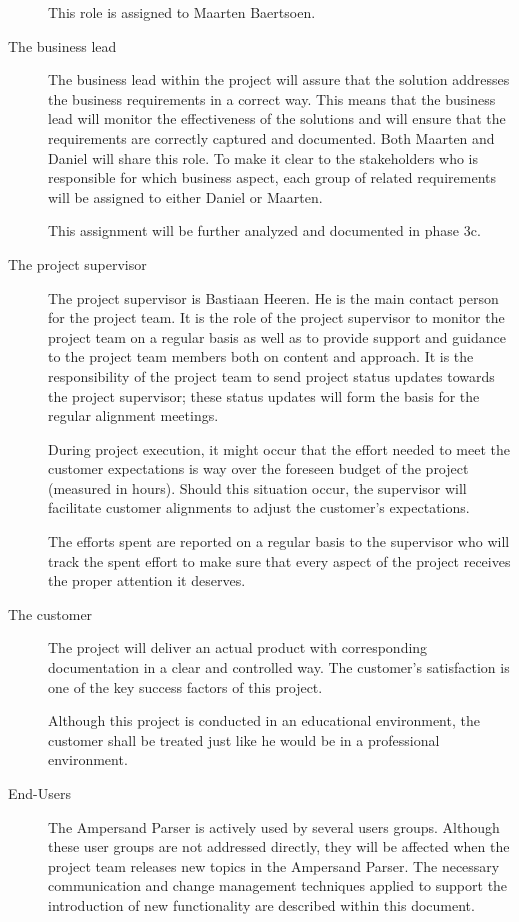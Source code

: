 \begin{description}
	This role is assigned to Maarten Baertsoen.

	\item[The business lead]
	The business lead within the project will assure that the solution addresses the business requirements in a correct way. 
	This means that the business lead will monitor the effectiveness of the solutions and will ensure that the requirements are correctly captured and documented.
	Both Maarten and Daniel will share this role.
	To make it clear to the stakeholders who is responsible for which business aspect, each group of related requirements will be assigned to either Daniel or Maarten.

	This assignment  will be further analyzed and documented in phase 3c.

	\item[The project supervisor]
	The project supervisor is Bastiaan Heeren.
	He is the main contact person for the project team.
	It is the role of the project supervisor to monitor the project team on a regular basis as well as to provide support and guidance to the project team members both on content and approach.
	It is the responsibility of the project team to send project status updates towards the project supervisor; these status updates will form the basis for the regular alignment meetings.

	During project execution, it might occur that the effort needed to meet the customer expectations is way over the foreseen budget of the project (measured in hours).
	Should this situation occur, the supervisor will facilitate customer alignments to adjust the customer's expectations.

	The efforts spent are reported on a regular basis to the supervisor who will track the spent effort to make sure that every aspect of the project receives the proper attention it deserves.

	\item[The customer]
	The project will deliver an actual product with corresponding documentation in a clear and controlled way.
	The customer's satisfaction is one of the key success factors of this project.

	Although this project is conducted in an educational environment, the customer shall be treated just like he would be in a professional environment.

	\item[End-Users]
	The Ampersand Parser is actively used by several users groups.
	Although these user groups are not addressed directly, they will be affected when the project team releases new topics in the Ampersand Parser.
	The necessary communication and change management techniques applied to support the introduction of new functionality are described within this document.


\end{description}
